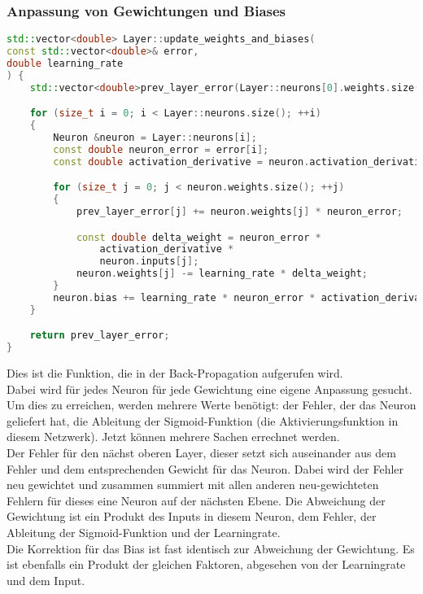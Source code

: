 \subsubsection{Anpassung von Gewichtungen und Biases}
\label{sec:RealAnpassungVonGewichtungenUndBiasesCode}
\begin{lstlisting}[language=c++]
std::vector<double> Layer::update_weights_and_biases(
const std::vector<double>& error, 
double learning_rate
) {
	std::vector<double>prev_layer_error(Layer::neurons[0].weights.size(), 0.0);

	for (size_t i = 0; i < Layer::neurons.size(); ++i) 
	{
		Neuron &neuron = Layer::neurons[i];
		const double neuron_error = error[i];
		const double activation_derivative = neuron.activation_derivative();

		for (size_t j = 0; j < neuron.weights.size(); ++j) 
		{
			prev_layer_error[j] += neuron.weights[j] * neuron_error;

			const double delta_weight = neuron_error * 
				activation_derivative * 
				neuron.inputs[j];
			neuron.weights[j] -= learning_rate * delta_weight;
		}
		neuron.bias += learning_rate * neuron_error * activation_derivative;
	}

	return prev_layer_error;
}

\end{lstlisting}
Dies ist die Funktion, die in der Back-Propagation aufgerufen wird.
\\
Dabei wird für jedes Neuron für jede Gewichtung eine eigene Anpassung gesucht. Um dies zu erreichen, werden mehrere Werte benötigt: der Fehler, der das Neuron geliefert hat, die Ableitung der Sigmoid-Funktion (die Aktivierungsfunktion in diesem Netzwerk). Jetzt können mehrere Sachen errechnet werden. 
\\
Der Fehler für den nächst oberen Layer, dieser setzt sich auseinander aus dem Fehler und dem entsprechenden Gewicht für das Neuron. Dabei wird der Fehler neu gewichtet und zusammen summiert mit allen anderen neu-gewichteten Fehlern für dieses eine Neuron auf der nächsten Ebene.
Die Abweichung der Gewichtung ist ein Produkt des Inputs in diesem Neuron, dem Fehler, der Ableitung der Sigmoid-Funktion und der Learningrate.
\\
Die Korrektion für das Bias ist fast identisch zur Abweichung der Gewichtung. Es ist ebenfalls ein Produkt der gleichen Faktoren, abgesehen von der Learningrate und dem Input.

